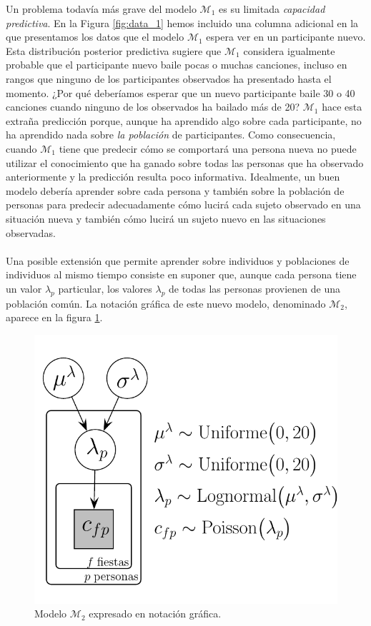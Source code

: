 \documentclass{article}
\begin{document}
\indent Un problema todavía más grave del modelo $\mathcal M_1$ es su limitada \emph{capacidad predictiva}. En la Figura \ref{fig:data_1} hemos incluido una columna adicional en la que presentamos los datos que el modelo $\mathcal M_1$ espera ver en un participante nuevo. Esta distribución posterior predictiva sugiere que $\mathcal M_1$ considera igualmente probable que el participante nuevo baile pocas o muchas canciones, incluso en rangos que ninguno de los participantes observados ha presentado hasta el momento. ¿Por qué deberíamos esperar que un nuevo participante baile 30 o 40 canciones cuando ninguno de los observados ha bailado más de 20? $\mathcal M_1$ hace esta extraña predicción porque, aunque ha aprendido algo sobre cada participante, no ha aprendido nada sobre \emph{la población} de participantes. Como consecuencia, cuando $\mathcal M_1$ tiene que predecir cómo se comportará una persona nueva no puede utilizar el conocimiento que ha ganado sobre todas las personas que ha observado anteriormente y la predicción resulta poco informativa. Idealmente, un buen modelo debería aprender sobre cada persona y también sobre la población de personas para predecir adecuadamente cómo lucirá cada sujeto observado en una situación nueva y también cómo lucirá un sujeto nuevo en las situaciones observadas.\\\\
\indent Una posible extensión que permite aprender sobre individuos y poblaciones de individuos al mismo tiempo consiste en suponer que, aunque cada persona tiene un valor $\lambda_p$ particular, los valores $\lambda_p$ de todas las personas provienen de una población común. La notación gráfica de este nuevo modelo, denominado $\mathcal M_2$, aparece en la figura \ref{fig:m_2}.

\begin{figure}[H]
\centerline{\includegraphics[width=.7\textwidth]{m_2.pdf}}
\caption{Modelo $\mathcal M_2$ expresado en notación gráfica.}
\label{fig:m_2}
\end{figure}
\end{document}
